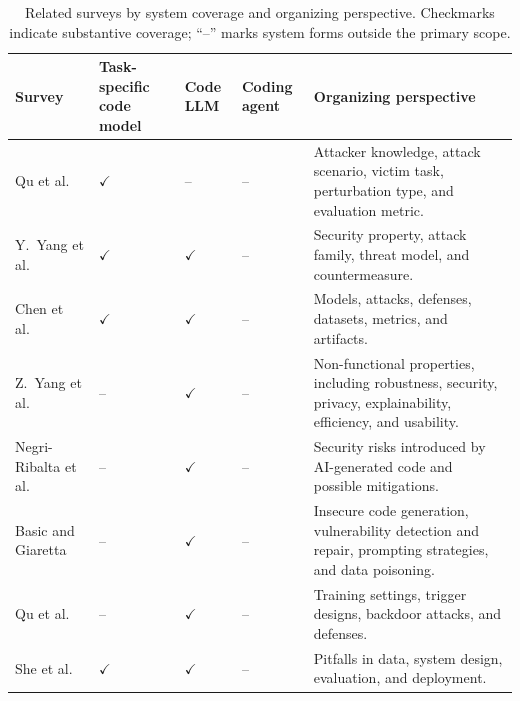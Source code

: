 \documentclass[acmsmall,screen,review,nonacm]{acmart}
\begin{document}
{\scriptsize
\renewcommand{\arraystretch}{1.10}
\setlength{\tabcolsep}{2.5pt}
\begin{table}[tp]
\centering
\caption{Related surveys by system coverage and organizing perspective. Checkmarks indicate substantive coverage; ``--'' marks system forms outside the primary scope.}
\label{tab:surveys}
\begin{tabular}{@{}L{2.00cm}C{2cm}C{1.05cm}C{1.15cm}L{7.00cm}@{}}
\toprule
\textbf{Survey} &
\textbf{Task-specific code model} &
\textbf{Code LLM} &
\textbf{Coding agent} &
\textbf{Organizing perspective} \\
\midrule

Qu et al.~\cite{qu2024robustnesssurvey} &
\(\checkmark\) &
-- &
-- &
Attacker knowledge, attack scenario, victim task, perturbation type, and evaluation metric. \\
\midrule

Y.~Yang et al.~\cite{yang2024survey} &
\(\checkmark\) &
\(\checkmark\) &
-- &
Security property, attack family, threat model, and countermeasure. \\
\midrule

Chen et al.~\cite{securitycode2024slr} &
\(\checkmark\) &
\(\checkmark\) &
-- &
Models, attacks, defenses, datasets, metrics, and artifacts. \\
\midrule

Z.~Yang et al.~\cite{robustness2024llms} &
-- &
\(\checkmark\) &
-- &
Non-functional properties, including robustness, security, privacy, explainability, efficiency, and usability. \\
\midrule

Negri-Ribalta et al.~\cite{negriribalta2024securegeneration} &
-- &
\(\checkmark\) &
-- &
Security risks introduced by AI-generated code and possible mitigations. \\
\midrule

Basic and Giaretta~\cite{basic2026codesecurity} &
-- &
\(\checkmark\) &
-- &
Insecure code generation, vulnerability detection and repair, prompting strategies, and data poisoning. \\
\midrule

Qu et al.~\cite{qu2025backdoorsurvey} &
-- &
\(\checkmark\) &
-- &
Training settings, trigger designs, backdoor attacks, and defenses. \\
\midrule

She et al.~\cite{she2026pitfalls} &
\(\checkmark\) &
\(\checkmark\) &
-- &
Pitfalls in data, system design, evaluation, and deployment. \\
\midrule


\end{tabular}
\end{table}}
\end{document}
